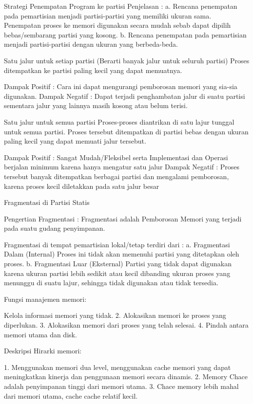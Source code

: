 Strategi Penempatan Program ke partisi
Penjelasan :
a. Rencana penempatan pada pemartisian menjadi partisi-partisi yang memiliki ukuran sama. Penempatan proses ke memori digunakan secara mudah sebab dapat dipilih bebas/sembarang partisi yang kosong.
b. Rencana penempatan pada pemartisian menjadi partisi-partisi dengan ukuran yang berbeda-beda.

Satu jalur untuk setiap partisi (Berarti banyak jalur untuk seluruh partisi) Proses ditempatkan ke partisi paling kecil yang dapat memuatnya.

Dampak Positif : Cara ini dapat mengurangi pemborosan memori yang sia-sia digunakan.
Dampak Negatif : Dapat terjadi penghambatan jalur di suatu partisi sementara jalur yang lainnya masih kosong atau belum terisi.

Satu jalur untuk semua partisi
Proses-proses diantrikan di satu lajur tunggal untuk semua partisi. Proses tersebut ditempatkan di partisi bebas dengan ukuran paling kecil
yang dapat memuati jalur tersebut.

Dampak Positif : Sangat Mudah/Fleksibel serta Implementasi dan Operasi berjalan minimum karena hanya mengatur satu jalur
Dampak Negatif : Proses tersebut banyak ditempatkan berbagai partisi dan mengalami pemborosan, karena proses kecil diletakkan pada satu jalur besar

Fragmentasi di Partisi Statis

Pengertian Fragmentasi :
Fragmentasi adalah Pemborosan Memori yang terjadi pada suatu gudang penyimpanan.

Fragmentasi di tempat pemartisian lokal/tetap terdiri dari :
a. Fragmentasi Dalam (Internal)
Proses ini tidak akan memenuhi partisi yang ditetapkan oleh proses.
b. Fragmentasi Luar (Eksternal)
Partisi yang tidak dapat digunakan karena ukuran partisi lebih sedikit atau kecil dibanding ukuran proses yang menunggu di suatu lajur,
sehingga tidak digunakan atau tidak tersedia.

Fungsi manajemen memori:

Kelola informasi memori yang tidak.
2. Alokasikan memori ke proses yang diperlukan.
3. Alokasikan memori dari proses yang telah selesai.
4. Pindah antara memori utama dan disk.

Deskripsi Hirarki memori:

1. Menggunakan memori dua level, menggunakan cache memori yang dapat meningkatkan kinerja dan penggunaan memori secara dinamis.
2. Memory Chace adalah penyimpanan tinggi dari memori utama.
3. Chace memory lebih mahal dari memori utama, cache cache relatif kecil.


